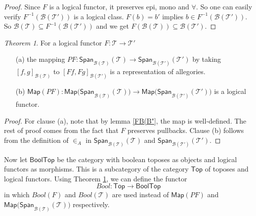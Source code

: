 \documentclass{tac}
\theoremstyle{definition}
\theoremstyle{remark}
\def\mc#1{\mathcal {#1}}
\def\B{\mc B}
\def\T{\mc T}
\newtheorem{theorem}{Theorem}
\begin{document}
\begin{proof}
	Since $F$ is a logical functor, it preserves epi, mono and $\forall$. So one can easily verify $F^{-1}(\B(\T'))$ is a logical class. $F(b)=b'$ implies $b\in F^{-1}(\B(\T'))$. So $\B(\T)\subseteq F^{-1}(\B(\T'))$ and we get $F(\B(\T))\subseteq \B(\T')$.
\end{proof}
\begin{theorem}\label{logical functor gives logical functor}
	For a logical functor $F:\T\rightarrow\T'$
	\begin{itemize}
		\item[(a)]
		the mapping $PF:\mathsf{Span}_{\B(\T)}(\T)\longrightarrow\mathsf{Span}_{\B(\T')}(\T')$ by taking $[f,g]_{\B(\T)}$ to $[Ff,Fg]_{\B(\T')}$ is a representation of allegories.
		\item[(b)]
		$\mathsf{Map}(PF):\mathsf{Map(Span}_{\B(\T)}(\T))\longrightarrow\mathsf{Map(Span}_{\B(\T')}(\T'))$ is a logical functor.
	\end{itemize}
\end{theorem}
\begin{proof}
For clause (a), note that  by lemma \ref{FB(B"}, the map is well-defined. The rest of proof comes from the fact that $F$ preserves pullbacks.
	Clause (b) follows from the definition of $\in_A$ in $\mathsf{Span}_{\B(\T)}(\T)$ and $\mathsf{Span}_{\B(\T')}(\T')$.
\end{proof}
Now let $\mathsf{BoolTop}$ be the category with boolean toposes as objects and logical functors as morphisms. This is a subcategory of the category $\mathsf{Top}$ of toposes and logical functors. Using Theorem \ref{logical functor gives logical functor}, we can define the  functor
$$Bool:\mathsf{Top}\longrightarrow \mathsf{BoolTop}$$
in which $Bool(F)$ and $Bool(\T)$ are used instead of $\mathsf{Map}(PF)$ and $\mathsf{Map(Span}_{\B(\T)}(\T))$ respectively.
\end{document}
